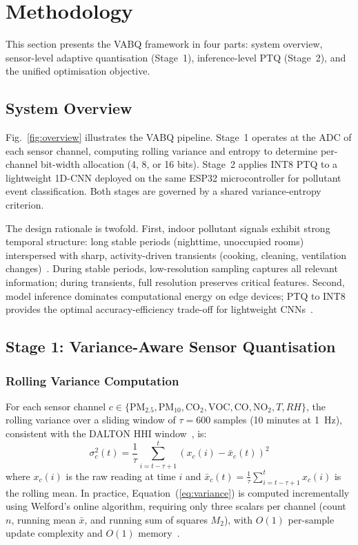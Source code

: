 \section{Methodology}
\label{sec:methodology}

This section presents the VABQ framework in four parts: system overview, sensor-level adaptive quantisation (Stage~1), inference-level PTQ (Stage~2), and the unified optimisation objective.

\subsection{System Overview}
\label{sec:meth_overview}

Fig.~\ref{fig:overview} illustrates the VABQ pipeline. Stage~1 operates at the ADC of each sensor channel, computing rolling variance and entropy to determine per-channel bit-width allocation (4, 8, or 16 bits). Stage~2 applies INT8 PTQ to a lightweight 1D-CNN deployed on the same ESP32 microcontroller for pollutant event classification. Both stages are governed by a shared variance-entropy criterion.

The design rationale is twofold. First, indoor pollutant signals exhibit strong temporal structure: long stable periods (nighttime, unoccupied rooms) interspersed with sharp, activity-driven transients (cooking, cleaning, ventilation changes)~\cite{karmakar2024exploring, karmakar2024indoor}. During stable periods, low-resolution sampling captures all relevant information; during transients, full resolution preserves critical features. Second, model inference dominates computational energy on edge devices; PTQ to INT8 provides the optimal accuracy-efficiency trade-off for lightweight CNNs~\cite{enhancingcnn2024, palakodety2025tpu}.

\subsection{Stage 1: Variance-Aware Sensor Quantisation}
\label{sec:meth_stage1}

\subsubsection{Rolling Variance Computation}

For each sensor channel $c \in \{\text{PM}_{2.5}, \text{PM}_{10}, \text{CO}_2, \text{VOC}, \text{CO}, \text{NO}_2, T, RH\}$, the rolling variance over a sliding window of $\tau = 600$ samples (10 minutes at 1~Hz), consistent with the DALTON HHI window~\cite{karmakar2024exploring}, is:
\begin{equation}
    \sigma_c^2(t) = \frac{1}{\tau} \sum_{i=t-\tau+1}^{t} \left( x_c(i) - \bar{x}_c(t) \right)^2
    \label{eq:variance}
\end{equation}
where $x_c(i)$ is the raw reading at time $i$ and $\bar{x}_c(t) = \frac{1}{\tau} \sum_{i=t-\tau+1}^{t} x_c(i)$ is the rolling mean. In practice, Equation~(\ref{eq:variance}) is computed incrementally using Welford's online algorithm, requiring only three scalars per channel (count $n$, running mean $\bar{x}$, and running sum of squares $M_2$), with $O(1)$ per-sample update complexity and $O(1)$ memory~\cite{atitallah2023autonomous}.

